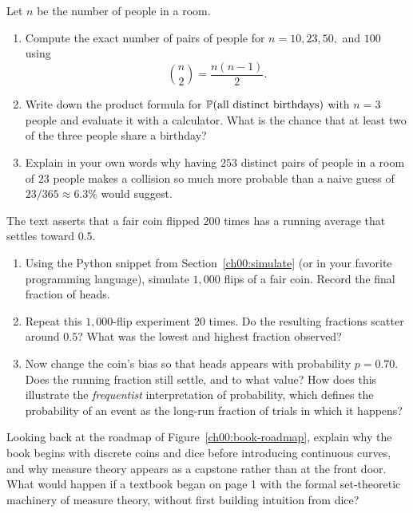 \begin{exercise}
\label{ch00:ex-collisions}
Let $n$ be the number of people in a room.
\begin{enumerate}
  \item Compute the exact number of pairs of people for $n = 10, 23, 50,$ and $100$ using
    \[
      \binom{n}{2} = \frac{n(n-1)}{2}.
    \]
  \item Write down the product formula for $\P(\text{all distinct birthdays})$ with $n=3$ people and evaluate it with a calculator. What is the chance that at least two of the three people share a birthday?
  \item Explain in your own words why having $253$ distinct pairs of people in a room of $23$ people makes a collision so much more probable than a naive guess of $23/365 \approx 6.3\%$ would suggest.
\end{enumerate}
\end{exercise}

\begin{exercise}
\label{ch00:ex-monte-carlo}
The text asserts that a fair coin flipped $200$ times has a running average that settles toward $0.5$.
\begin{enumerate}
  \item Using the Python snippet from Section~\ref{ch00:simulate} (or in your favorite programming language), simulate $1{,}000$ flips of a fair coin. Record the final fraction of heads.
  \item Repeat this $1{,}000$-flip experiment $20$ times. Do the resulting fractions scatter around $0.5$? What was the lowest and highest fraction observed?
  \item Now change the coin's bias so that heads appears with probability $p = 0.70$. Does the running fraction still settle, and to what value? How does this illustrate the \emph{frequentist} interpretation of probability, which defines the probability of an event as the long-run fraction of trials in which it happens?
\end{enumerate}
\end{exercise}

\begin{exercise}
\label{ch00:ex-four-stages}
Looking back at the roadmap of Figure~\ref{ch00:book-roadmap}, explain why the book begins with discrete coins and dice before introducing continuous curves, and why measure theory appears as a capstone rather than at the front door. What would happen if a textbook began on page 1 with the formal set-theoretic machinery of measure theory, without first building intuition from dice?
\end{exercise}

